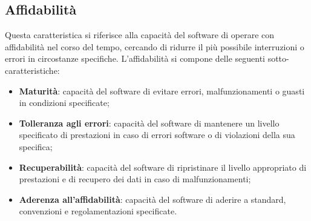\subsection{Affidabilità}
Questa caratteristica si riferisce alla capacità del software di operare con affidabilità nel corso
del tempo, cercando di ridurre il più possibile interruzioni o errori in circostanze specifiche.
L’affidabilità si compone delle seguenti sotto-caratteristiche:
\begin{itemize}
    \item \textbf{Maturità}: capacità del software di evitare errori, malfunzionamenti o guasti in condizioni specificate;
    \item \textbf{Tolleranza agli errori}: capacità del software di mantenere un livello specificato di prestazioni in caso di errori software o di violazioni della sua specifica;
    \item \textbf{Recuperabilità}: capacità del software di ripristinare il livello appropriato di prestazioni e di recupero dei dati in caso di malfunzionamenti;
    \item \textbf{Aderenza all’affidabilità}: capacità del software di aderire a standard, convenzioni e regolamentazioni specificate.
\end{itemize}


